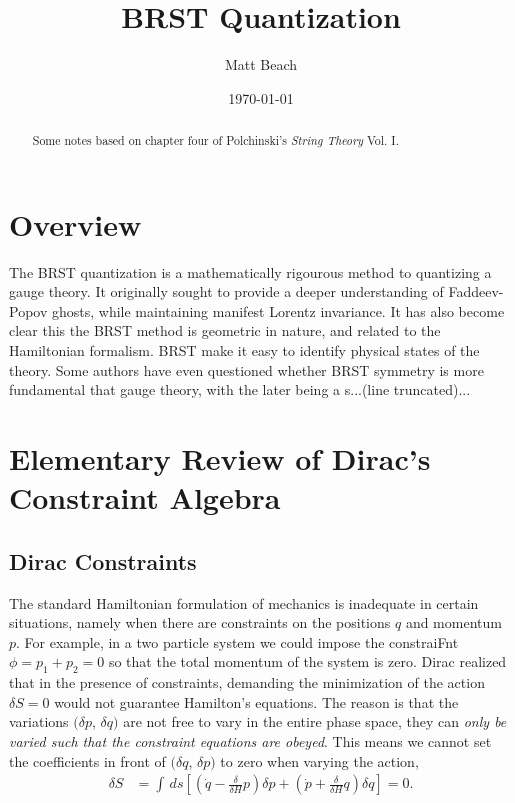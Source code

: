 \documentclass[notitlepage,amsmath,amssymb,aps, pra, 10pt]{revtex4-1}
\newcommand{\vd}[2][]{\frac{\delta#1}{\delta#2}}
\begin{document}
\title{BRST Quantization }

\author{Matt Beach}
\date{\today}
\begin{abstract}
    Some notes based on chapter four of Polchinski's \emph{String Theory} Vol. I.
\end{abstract}
\maketitle
\tableofcontents

\section{Overview}
    The BRST quantization is a mathematically rigourous method to quantizing a gauge theory. It originally sought to provide a deeper understanding of Faddeev-Popov ghosts, while maintaining manifest Lorentz invariance. It has also become clear this the BRST method is geometric in nature, and related to the Hamiltonian formalism. BRST make it easy to identify physical states of the theory. Some authors have even questioned whether BRST symmetry is more fundamental that gauge theory, with the later being a s...(line truncated)...

\section{Elementary Review of Dirac's Constraint Algebra}
    \subsection{Dirac Constraints}
    The standard Hamiltonian formulation of mechanics is inadequate in certain situations, namely when there are constraints on the positions $q$ and momentum $p$. For example, in a two particle system we could impose the constraiFnt $\phi = p_1 + p_2 = 0$ so that the total momentum of the system is zero. Dirac realized that in the presence of constraints, demanding the minimization of the action $\delta S = 0$ would not guarantee Hamilton's equations. The reason is that the variations $(\delta p$, $\delta q)$ are not free to vary in the entire phase space, they can \emph{only be varied such that the constraint equations are obeyed}. This means we cannot set the coefficients in front of $(\delta q$, $\delta p)$ to zero when varying the action,
     \begin{align}
         \delta S &= \int \, ds \left[ \left(\dot q -\vd{H}{p}\right)\delta p + \left(\dot p + \vd{H}{q}\right) \delta q\right] =0.
     \end{align}
\end{document}
